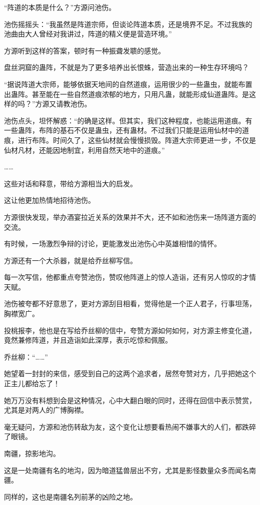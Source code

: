 \begin{this_body}
“阵道的本质是什么？”方源问池伤。

池伤摇摇头：“我虽然是阵道宗师，但谈论阵道本质，还是境界不足。不过我族的池曲由大人曾经对我讲过，阵道的精义便是营造环境。”

方源听到这样的答案，顿时有一种振聋发聩的感觉。

盘丝洞窟的蛊阵，不就是为了更多培养出长恨蛛，营造出来的一种生存环境吗？

“据说阵道大宗师，能够依据天地间的自然道痕，运用很少的一些蛊虫，就能布置出蛊阵。甚至能在一些自然道痕浓郁的地方，只用凡蛊，就能形成仙道蛊阵。是这样的吗？”方源又请教池伤。

池伤点头，坦怀解惑：“的确是这样。但其实，我们这种程度，也能运用道痕。有一些蛊阵，布阵的基石不仅是蛊虫，还有蛊材。不过我们只能是运用仙材中的道痕，进行布阵。时间久了，这些仙材就会慢慢损毁。阵道大宗师更进一步，不仅是仙材凡材，还能因地制宜，利用自然天地中的道痕。”

……

这些对话和释意，带给方源相当大的启发。

这让他更加热情地招待池伤。

方源很快发现，举办酒宴拉近关系的效果并不大，还不如和池伤来一场阵道方面的交流。

有时候，一场激烈争辩的讨论，更能激发出池伤心中英雄相惜的情怀。

方源还有一个大杀器，就是给乔丝柳写信。

每一次写信，他都重点夸赞池伤，赞叹他阵道上的惊人造诣，还有另人惊叹的才情天赋。

池伤被夸都不好意思了，更对方源刮目相看，觉得他是一个正人君子，行事坦荡，胸襟宽广。

投桃报李，他也是在写给乔丝柳的信中，夸赞方源如何如何，对方源主修变化道，竟然兼修阵道，并且造诣如此深厚，表示吃惊和佩服。

乔丝柳：“……”

她望着一封封的来信，感受到自己的这两个追求者，居然夸赞对方，几乎把她这个正主儿都给忘了！

她万万没有料想到会是这种情况，心中大翻白眼的同时，还得在回信中表示赞赏，尤其是对两人的广博胸襟。

毫无疑问，方源和池伤转敌为友，这个变化让想要看热闹不嫌事大的人们，都跌碎了眼镜。

南疆，掠影地沟。

这是一处南疆有名的地沟，因为暗道猛兽层出不穷，尤其是影怪数量众多而闻名南疆。

同样的，这也是南疆名列前茅的凶险之地。


\end{this_body}
